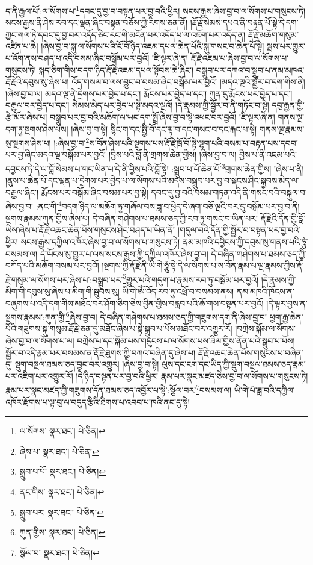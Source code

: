ད་ནི་རྒྱལ་པོ་:ལ་སོགས་པ་\footnote{ལ་སོགས་  སྣར་ཐང་།  པེ་ཅིན། }དབང་དུ་བྱ་བ་བསྟན་པར་བྱ་བའི་ཕྱིར། སངས་རྒྱས་ཞེས་བྱ་བ་ལ་སོགས་པ་གསུངས་ཏེ། སངས་རྒྱས་ནི་ཤེས་རབ་དང་ལྡན་ཞིང་བསྟན་བཅོས་ཀྱི་རིགས་ཅན་ནོ། །རྡོ་རྗེ་སེམས་དཔའ་ནི་བརྟན་པོ་སྟེ་དེ་དག་ཀྱང་གལ་ཏེ་དབང་དུ་བྱ་བར་འདོད་ཅིང་རང་གི་མངོན་པར་འདོད་པ་ལ་འཇོག་པར་འདོད་ན། རྡོ་རྗེ་མཆོག་གསུམ་འཛིན་པ་ཆེ། །ཞེས་བྱ་བ་སྐུ་ལ་སོགས་པའི་ངོ་བོ་ཉིད་འཇམ་དཔལ་ཆེན་པོའི་སྐུ་གསང་བ་ཆེན་པོ་སྟེ། སྦས་པར་གྱུར་པ་འོག་ནས་བཤད་པ་འདི་བསམ་ཞིང་བསྒོམ་པར་བྱའོ། །ཇི་ལྟར་ཞེ་ན། རྡོ་རྗེ་འཇམ་པ་ཞེས་བྱ་བ་ལ་སོགས་པ་གསུངས་ཏེ། སྐད་ཅིག་གིས་བདག་ཉིད་རྡོ་རྗེ་འཇམ་དཔལ་སྟོབས་ཆེ་ཞིང་། བསྒྲུབ་པར་དཀའ་བ་སྒྲུབ་པ་ནམ་མཁའ་རྡོ་རྗེའི་དབུས་སུ་ཞེས་པ། འོད་གསལ་བ་ལས་བྱུང་བ་བསམ་ཞིང་བསྒོམ་པར་བྱའོ། །མདའ་ལྔའི་སྦྱོར་བ་དག་གིས་ནི། །ཞེས་བྱ་བ་ལ། མདའ་ལྔ་ནི་དྲེགས་པར་བྱེད་པ་དང་། རྨོངས་པར་བྱེད་པ་དང་། ཀུན་དུ་རྨོངས་པར་བྱེད་པ་དང་། བརྒྱལ་བར་བྱེད་པ་དང་། སེམས་མེད་པར་བྱེད་པ་སྟེ་མདའ་ལྔའོ། །དེ་རྣམས་ཀྱི་སྦྱོར་བ་ནི་གཏོང་བ་སྟེ། དབུ་རྒྱན་གྱི་རྩེ་མོར་ཞེས་པ། བསྒྲུབ་པར་བྱ་བའི་མཆོག་ལ་ཡང་དག་སྤྲོ་ཞེས་བྱ་བ་སྟེ་འཕང་བར་བྱའོ། །ཇི་ལྟར་ཞེ་ན། གནས་ལྔ་དག་ཏུ་སྔགས་ཤེས་པས། །ཞེས་བྱ་བ་སྟེ། སྙིང་ག་དང་སྤྱི་བོ་དང་ལྟ་བ་དང་གསང་བ་དང་རྐང་པ་སྟེ། གནས་ལྔ་རྣམས་སུ་སྔགས་ཤེས་པ། །:ཞེས་བྱ་བ་\footnote{ཞེས་པ་  སྣར་ཐང་།  པེ་ཅིན། }ས་བོན་ཤེས་པའི་སྔགས་པས་རྡོ་རྗེ་ཁྲོ་བོ་སྟེ་ལྷག་པའི་བསམ་པ་བརྟན་པས་དབབ་པར་བྱ་ཞིང་མདའ་ལྔ་བསྒོམ་པར་བྱའོ། །བྱིས་པའི་བློ་ནི་གྲགས་ཆེན་གྱིས། །ཞེས་བྱ་བ་ལ། བྱིས་པ་ནི་འཇམ་པའི་དབྱངས་ཏེ་དེ་ལ་བློ་སེམས་པ་གང་ཡིན་པ་དེ་ནི་བྱིས་པའི་བློ་སྟེ། :སྒྲུབ་པ་པོ་ཆེན་པོ་\footnote{སྒྲུབ་པ་པོ་  སྣར་ཐང་།  པེ་ཅིན། }གྲགས་ཆེན་གྱིས། །ཞེས་པ་ནི། །ནུས་པ་ཆེན་པོ་དང་ལྡན་པ་དྲེགས་པར་བྱེད་པ་ལ་སོགས་པའི་མདས་བསྒྲུབ་པར་བྱ་བ་སྡངས་ཤིང་སྐྱབས་མེད་ལ་བརྒྱལ་ཞིང་། རྨོངས་པར་བསྒོམ་ཞིང་བསམ་པར་བྱ་སྟེ། དབང་དུ་བྱ་བའི་བསམ་གཏན་འདི་ནི་གསང་བའི་བསྐུལ་བ་ཞེས་བྱ་བ། :ནང་གི་\footnote{ནང་གིས་  སྣར་ཐང་།  པེ་ཅིན། }བདག་ཉིད་ལ་མཆོག་ཏུ་གཞོལ་བས་ཟླ་བ་ཕྱེད་དེ་ཞག་བཅོ་ལྔའི་བར་དུ་བསྒོམ་པར་བྱ་བ་ནི། སྔགས་རྣམས་ཀུན་གྱིས་ཞེས་པ། དེ་བཞིན་གཤེགས་པ་ཐམས་ཅད་ཀྱི་རབ་ཏུ་གསང་བ་ཡིན་པར། རྡོ་རྗེའི་དོན་གྱི་བློ་ཡིས་ཞེས་པ་རྡོ་རྗེ་འཆང་ཆེན་པོས་གསུངས་ཤིང་བཤད་པ་ཡིན་ནོ། །གདུལ་བའི་དོན་གྱི་སྦྱོར་བ་བསྟན་པར་བྱ་བའི་ཕྱིར། སངས་རྒྱས་དཀྱིལ་འཁོར་ཞེས་བྱ་བ་ལ་སོགས་པ་གསུངས་ཏེ། ནམ་མཁའི་དབྱིངས་ཀྱི་དབུས་སུ་གནས་པའི་ཧཱུཾ་བསམས་ལ། དེ་ཡོངས་སུ་གྱུར་པ་ལས་སངས་རྒྱས་ཀྱི་དཀྱིལ་འཁོར་ཞེས་བྱ་བ། དེ་བཞིན་གཤེགས་པ་ཐམས་ཅད་ཀྱི་བཀོད་པའི་མཆོག་བསམ་པར་བྱའོ། །སྔགས་ཀྱི་རྡོ་རྗེ་ནི་ཡི་གེ་ཧཱུཾ་སྟེ་དེ་ལ་སོགས་པ་ས་བོན་རྣམ་པ་ལྔ་རྣམས་ཀྱིས་རྡོ་རྗེ་གསུམ་ལ་སོགས་པར་ཞེས་པ་:བསྒྲུབ་པར་\footnote{སྒྲུབ་པར་  སྣར་ཐང་།  པེ་ཅིན། }གྱུར་པའི་གདུག་པ་རྣམས་རབ་ཏུ་བསྒོམ་པར་བྱའོ། །དེ་རྣམས་ཀྱི་མིག་གི་དབུས་སུ་ཞེས་པ་མིག་གི་སྦུབས་སུ། ཡི་གེ་ཨོཾ་འོད་རབ་ཏུ་འཕྲོ་བ་བསམས་ནས། ནམ་མཁའི་ཁོངས་ན་བཞུགས་པ་འདི་དག་གིས་མཐོང་བར་ཤོག་ཅིག་ཅེས་བྱིན་གྱིས་བརླབ་པའི་ཆོ་གས་བསྟན་པར་བྱའོ། །དེ་ལྟར་བྱས་ན་སྔགས་རྣམས་:ཀུན་གྱི་\footnote{ཀུན་གྱིས་  སྣར་ཐང་།  པེ་ཅིན། }ཞེས་བྱ་བ། དེ་བཞིན་གཤེགས་པ་ཐམས་ཅད་ཀྱི་གཟུགས་དག་ནི་ཞེས་བྱ་བ། ཕྱག་རྒྱ་ཆེན་པོའི་གཟུགས་སྐུ་གསུམ་རྡོ་རྗེ་ཅན་དུ་མཐོང་ཞེས་པ་སྟེ་སྒྲུབ་པ་པོས་མཐོང་བར་འགྱུར་རོ། །བཀྲེས་སྐོམ་ལ་སོགས་ཞེས་བྱ་བ་ལ་སོགས་པ་ལ། བཀྲེས་པ་དང་སྐོམ་པས་གདུངས་པ་ལ་སོགས་པས་ཟིལ་གྱིས་ནོན་པའི་སྒྲུབ་པ་པོས། སྦྱོར་བ་འདི་རྣམ་པར་བསམས་ན་རྡོ་རྗེ་ཐུགས་ཀྱི་བཀའ་བཞིན་དུ་ཞེས་པ། རྡོ་རྗེ་འཆང་ཆེན་པོས་གསུངས་པ་བཞིན་དུ། སྡུག་བསྔལ་ཐམས་ཅད་བྱང་བར་འགྱུར། །ཞེས་བྱ་བ་སྟེ། ལུས་དང་ངག་དང་ཡིད་ཀྱི་སྡུག་བསྔལ་ཐམས་ཅད་རྣམ་པར་འཇིག་པར་འགྱུར་རོ། །དེ་ཉིད་བསྟན་པར་བྱ་བའི་ཕྱིར། རྣམ་པར་སྣང་མཛད་ཅེས་བྱ་བ་ལ་སོགས་པ་གསུངས་ཏེ། རྣམ་པར་སྣང་མཛད་ཀྱི་གཟུགས་དོན་ཐམས་ཅད་འབྱོར་པ་སྟེ་:སྩོལ་བར་\footnote{སྩོལ་བ་  སྣར་ཐང་།  པེ་ཅིན། }བསམས་ལ། ཡི་གེ་པཾ་ཟླ་བའི་དཀྱིལ་འཁོར་རྫོགས་པ་ལྟ་བུ་ལ་བདུད་རྩིའི་ཐིགས་པ་འབབ་པ་ཁའི་ནང་དུ་སྟེ། 